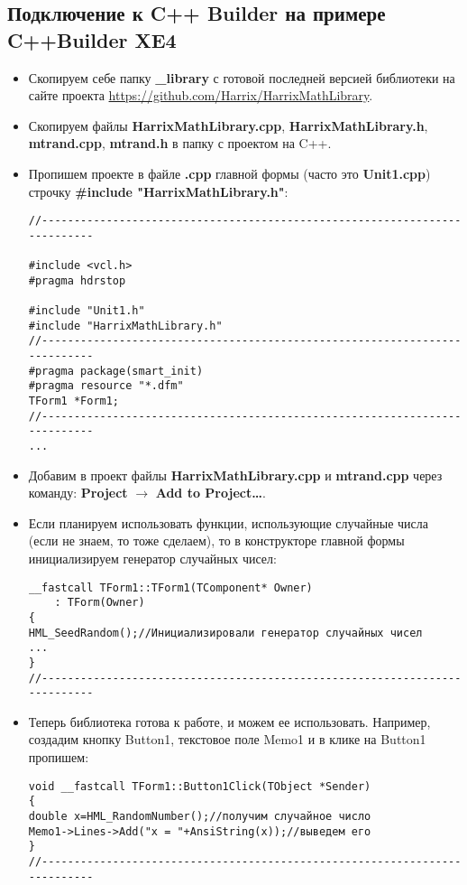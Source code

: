 \subsection{Подключение к C++ Builder на примере C++Builder XE4}
\begin{itemize}
\item Скопируем себе папку \textbf{\_library} с готовой последней версией библиотеки на сайте проекта \href{https://github.com/Harrix/HarrixMathLibrary}{https://github.com/Harrix/HarrixMathLibrary}.

\item Скопируем файлы \textbf{HarrixMathLibrary.cpp}, \textbf{HarrixMathLibrary.h}, \textbf{mtrand.cpp}, \textbf{mtrand.h} в папку с проектом на C++.

\item Пропишем проекте в файле \textbf{.cpp} главной формы (часто это \textbf{Unit1.cpp}) строчку \textbf{\#include "HarrixMathLibrary.h"}:
\begin{lstlisting}[label=install_code_04,caption=Подключение библиотеки]
//---------------------------------------------------------------------------

#include <vcl.h>
#pragma hdrstop

#include "Unit1.h"
#include "HarrixMathLibrary.h"
//---------------------------------------------------------------------------
#pragma package(smart_init)
#pragma resource "*.dfm"
TForm1 *Form1;
//---------------------------------------------------------------------------
...
\end{lstlisting}

\item Добавим в проект файлы \textbf{HarrixMathLibrary.cpp} и \textbf{mtrand.cpp} через команду: \textbf{Project} $\rightarrow$ \textbf{Add to Project\dots}.

\item Если планируем использовать функции, использующие случайные числа (если не знаем, то тоже сделаем), то в конструкторе главной формы инициализируем генератор случайных чисел:
\begin{lstlisting}[label=install_code_05,caption=Инициализация генератора случайных чисел]
__fastcall TForm1::TForm1(TComponent* Owner)
	: TForm(Owner)
{
HML_SeedRandom();//Инициализировали генератор случайных чисел
...
}
//---------------------------------------------------------------------------
\end{lstlisting}

\item Теперь библиотека готова к работе, и можем ее использовать. Например, создадим кнопку Button1, текстовое поле Memo1 и в клике на Button1 пропишем:
\begin{lstlisting}[label=install_code_06,caption=Пример использования]
void __fastcall TForm1::Button1Click(TObject *Sender)
{
double x=HML_RandomNumber();//получим случайное число
Memo1->Lines->Add("x = "+AnsiString(x));//выведем его
}
//---------------------------------------------------------------------------
\end{lstlisting}
\end{itemize}

